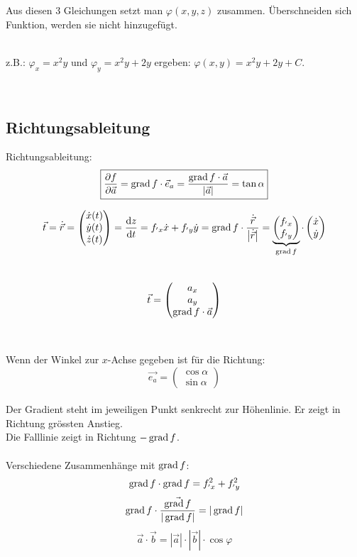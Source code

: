 Aus diesen 3 Gleichungen setzt man $\varphi(x,y,z)$ zusammen. Überschneiden sich Funktion, werden sie nicht hinzugefügt.\\
\\
\begin{footnotesize}
z.B.: $\varphi_{x}=x^2y$ und $\varphi_{y}=x^2y +2y$ ergeben: $\varphi(x,y)=x^2y +2y+C$.
\end{footnotesize}
\\


\subsection{Richtungsableitung}
Richtungsableitung:
\[\boxed{
	\frac{\partial f}{\partial \vec{a}} = \operatorname{grad} f \cdot \vec{e}_a = \frac{\operatorname{grad} f \cdot \vec{a}}{\left| \vec{a} \right|} = \tan\alpha
}\]

\[
	\vec{t}=\dot{\vec{r}}=
	\begin{pmatrix}
	 	\dot{x}(t)\\
		\dot{y}(t)\\
		\dot{z}(t)
	\end{pmatrix}
	=
	\frac{\mathrm{d} z}{\mathrm{d} t}=f_{'x}\dot x +f_{'y} \dot y
	=
	\operatorname{grad} f\cdot \frac{\dot{\vec{r}}}{\left| \dot{\vec{r}}\right| }
	=
	\underbrace{
		\begin{pmatrix}
				 	f_{'x}\\
					f_{'y}
			\end{pmatrix}
	}_{\operatorname{grad} f}
	\cdot
	\begin{pmatrix}
			 	\dot x\\
				\dot y
		\end{pmatrix}	
\]
\\
\[
	\vec{t}=	
	\begin{pmatrix}
		a_x\\
		a_y\\
		\operatorname{grad} f\cdot \vec{a}
	\end{pmatrix}
\]
\\
\\
Wenn der Winkel zur $x$-Achse gegeben ist für die Richtung:
\[
	\vec{e_a}=	
	\begin{pmatrix}
		\cos\alpha\\
		\sin\alpha
	\end{pmatrix}
\]
\\
Der Gradient steht im jeweiligen Punkt senkrecht zur Höhenlinie. Er zeigt in Richtung grössten Anstieg.\\
Die Falllinie zeigt in Richtung $-\operatorname{grad} f$.
\\
\\
Verschiedene Zusammenhänge mit $\operatorname{grad} f$:
\[
	\operatorname{grad} f \cdot \operatorname{grad} f = f_{'x}^2+f_{'y}^2
\]
\[
	\operatorname{grad} f\cdot \frac{	\vec{\operatorname{grad} f}}{|\operatorname{grad} f|}=|\operatorname{grad} f|
\]
\[
	\vec{a} \cdot	\vec{b} = 	\left| \vec{a} \right| \cdot	\left| \vec{b} \right| \cdot \cos \varphi
\]

